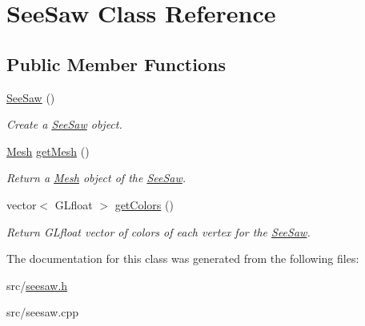 \hypertarget{classSeeSaw}{}\section{See\+Saw Class Reference}
\label{classSeeSaw}
\subsection*{Public Member Functions}
\begin{DoxyCompactItemize}
\item 
\hyperlink{classSeeSaw_ae3ffd079e48bdfee79efb1cf26fa1d74}{See\+Saw} ()\hypertarget{classSeeSaw_ae3ffd079e48bdfee79efb1cf26fa1d74}{}\label{classSeeSaw_ae3ffd079e48bdfee79efb1cf26fa1d74}

\begin{DoxyCompactList}\small\item\em Create a \hyperlink{classSeeSaw}{See\+Saw} object. \end{DoxyCompactList}\item 
\hyperlink{classMesh}{Mesh} \hyperlink{classSeeSaw_a87b98f345b1f542ef97af96b6e91cc6f}{get\+Mesh} ()\hypertarget{classSeeSaw_a87b98f345b1f542ef97af96b6e91cc6f}{}\label{classSeeSaw_a87b98f345b1f542ef97af96b6e91cc6f}

\begin{DoxyCompactList}\small\item\em Return a \hyperlink{classMesh}{Mesh} object of the \hyperlink{classSeeSaw}{See\+Saw}. \end{DoxyCompactList}\item 
vector$<$ G\+Lfloat $>$ \hyperlink{classSeeSaw_a6761f99d1008eaf2b6a02e1b5ad969bc}{get\+Colors} ()\hypertarget{classSeeSaw_a6761f99d1008eaf2b6a02e1b5ad969bc}{}\label{classSeeSaw_a6761f99d1008eaf2b6a02e1b5ad969bc}

\begin{DoxyCompactList}\small\item\em Return G\+Lfloat vector of colors of each vertex for the \hyperlink{classSeeSaw}{See\+Saw}. \end{DoxyCompactList}\end{DoxyCompactItemize}


The documentation for this class was generated from the following files\+:\begin{DoxyCompactItemize}
\item 
src/\hyperlink{seesaw_8h}{seesaw.\+h}\item 
src/seesaw.\+cpp\end{DoxyCompactItemize}
